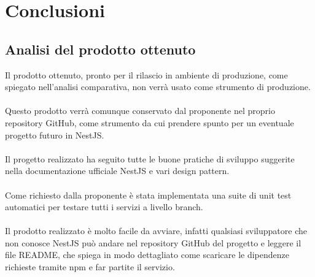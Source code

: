 
\chapter{Conclusioni}
\label{cap:conclusioni}

\section{Analisi del prodotto ottenuto}
Il prodotto ottenuto, pronto per il rilascio in ambiente di produzione, come spiegato nell'analisi
comparativa, non verrà usato come strumento di produzione.
\\\\
Questo prodotto verrà comunque conservato dal proponente nel proprio repository GitHub, come strumento
da cui prendere spunto per un eventuale progetto futuro in NestJS.
\\\\
Il progetto realizzato ha seguito tutte le buone pratiche di sviluppo suggerite nella documentazione ufficiale
NestJS e vari design pattern.
\\\\
Come richiesto dalla proponente è stata implementata una suite di unit test automatici per testare tutti i servizi 
a livello branch.
\\\\
Il prodotto realizzato è molto facile da avviare, infatti qualsiasi sviluppatore che non conosce NestJS può andare 
nel repository GitHub del progetto e leggere il file README, che spiega in modo dettagliato come scaricare le 
dipendenze richieste tramite npm e far partite il servizio.

